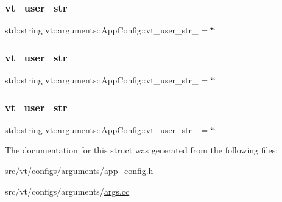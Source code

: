 \subsubsection{\texorpdfstring{vt\+\_\+user\+\_\+str\+\_}{vt\_user\_str\_1}}
{\footnotesize\ttfamily std\+::string vt\+::arguments\+::\+App\+Config\+::vt\+\_\+user\+\_\+str\+\_ = \char`\"{}\char`\"{}}

\mbox{\label{structvt_1_1arguments_1_1_app_config_ae32089b77ac32131a690657847c7e194}} 
\subsubsection{\texorpdfstring{vt\+\_\+user\+\_\+str\+\_}{vt\_user\_str\_2}}
{\footnotesize\ttfamily std\+::string vt\+::arguments\+::\+App\+Config\+::vt\+\_\+user\+\_\+str\+\_ = \char`\"{}\char`\"{}}

\mbox{\label{structvt_1_1arguments_1_1_app_config_a98ff430b46d126075db46ef5a9fb9c70}} 
\subsubsection{\texorpdfstring{vt\+\_\+user\+\_\+str\+\_}{vt\_user\_str\_3}}
{\footnotesize\ttfamily std\+::string vt\+::arguments\+::\+App\+Config\+::vt\+\_\+user\+\_\+str\+\_ = \char`\"{}\char`\"{}}



The documentation for this struct was generated from the following files\+:\begin{DoxyCompactItemize}
\item 
src/vt/configs/arguments/\hyperlink{app__config_8h}{app\+\_\+config.\+h}\item 
src/vt/configs/arguments/\hyperlink{args_8cc}{args.\+cc}\end{DoxyCompactItemize}
